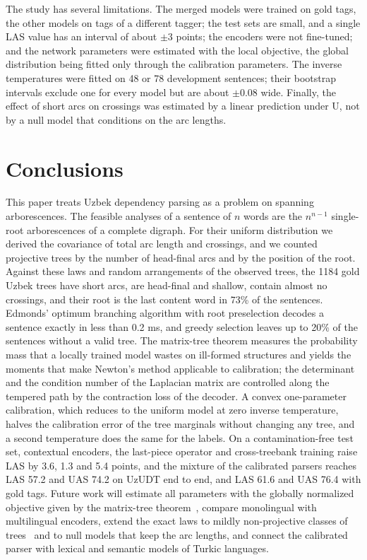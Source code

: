 \documentclass[mathematics,article,submit,pdftex,oneauthor]{Definitions/mdpi}
\begin{document}
The study has several limitations.
The merged models were trained on gold tags, the other models on tags of a different tagger; the test sets are small, and a single LAS value has an interval of about $\pm3$ points; the encoders were not fine-tuned; and the network parameters were estimated with the local objective, the global distribution being fitted only through the calibration parameters.
The inverse temperatures were fitted on 48 or 78 development sentences; their bootstrap intervals exclude one for every model but are about $\pm0.08$ wide.
Finally, the effect of short arcs on crossings was estimated by a linear prediction under U, not by a null model that conditions on the arc lengths.

\section{Conclusions}\label{sec:conclusions}

This paper treats Uzbek dependency parsing as a problem on spanning arborescences.
The feasible analyses of a sentence of $n$ words are the $n^{n-1}$ single-root arborescences of a complete digraph.
For their uniform distribution we derived the covariance of total arc length and crossings, and we counted projective trees by the number of head-final arcs and by the position of the root.
Against these laws and random arrangements of the observed trees, the 1184 gold Uzbek trees have short arcs, are head-final and shallow, contain almost no crossings, and their root is the last content word in 73\% of the sentences.
Edmonds' optimum branching algorithm with root preselection decodes a sentence exactly in less than 0.2 ms, and greedy selection leaves up to 20\% of the sentences without a valid tree.
The matrix-tree theorem measures the probability mass that a locally trained model wastes on ill-formed structures and yields the moments that make Newton's method applicable to calibration; the determinant and the condition number of the Laplacian matrix are controlled along the tempered path by the contraction loss of the decoder.
A convex one-parameter calibration, which reduces to the uniform model at zero inverse temperature, halves the calibration error of the tree marginals without changing any tree, and a second temperature does the same for the labels.
On a contamination-free test set, contextual encoders, the last-piece operator and cross-treebank training raise LAS by 3.6, 1.3 and 5.4 points, and the mixture of the calibrated parsers reaches LAS 57.2 and UAS 74.2 on UzUDT end to end, and LAS 61.6 and UAS 76.4 with gold tags.
Future work will estimate all parameters with the globally normalized objective given by the matrix-tree theorem~\cite{Koo2007,Zhang2020TreeCRF}, compare monolingual with multilingual encoders, extend the exact laws to mildly non-projective classes of trees~\cite{Kuhlmann2013} and to null models that keep the arc lengths, and connect the calibrated parser with lexical and semantic models of Turkic languages.
\end{document}
